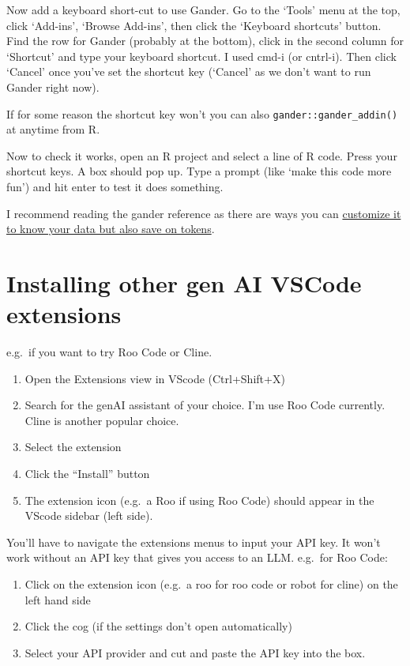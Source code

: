 \documentclass[
  letterpaper,
  DIV=11,
  numbers=noendperiod]{scrreprt}
\providecommand{\tightlist}{%
  \setlength{\itemsep}{0pt}\setlength{\parskip}{0pt}}\usepackage{longtable,booktabs,array}
\begin{document}
Now add a keyboard short-cut to use Gander. Go to the `Tools' menu at
the top, click `Add-ins', `Browse Add-ins', then click the `Keyboard
shortcuts' button. Find the row for Gander (probably at the bottom),
click in the second column for `Shortcut' and type your keyboard
shortcut. I used cmd-i (or cntrl-i). Then click `Cancel' once you've set
the shortcut key (`Cancel' as we don't want to run Gander right now).

If for some reason the shortcut key won't you can also
\texttt{gander::gander\_addin()} at anytime from R.

Now to check it works, open an R project and select a line of R code.
Press your shortcut keys. A box should pop up. Type a prompt (like `make
this code more fun') and hit enter to test it does something.

I recommend reading the gander reference as there are ways you can
\href{https://simonpcouch.github.io/gander/articles/gander.html}{customize
it to know your data but also save on tokens}.

\section{Installing other gen AI VSCode
extensions}\label{sec-otheroptions}

e.g.~if you want to try Roo Code or Cline.

\begin{enumerate}
\def\labelenumi{\arabic{enumi}.}
\tightlist
\item
  Open the Extensions view in VScode (Ctrl+Shift+X)
\item
  Search for the genAI assistant of your choice. I'm use Roo Code
  currently. Cline is another popular choice.
\item
  Select the extension
\item
  Click the ``Install'' button
\item
  The extension icon (e.g.~a Roo if using Roo Code) should appear in the
  VScode sidebar (left side).
\end{enumerate}

You'll have to navigate the extensions menus to input your API key. It
won't work without an API key that gives you access to an LLM. e.g.~for
Roo Code:

\begin{enumerate}
\def\labelenumi{\arabic{enumi}.}
\tightlist
\item
  Click on the extension icon (e.g.~a roo for roo code or robot for
  cline) on the left hand side
\item
  Click the cog (if the settings don't open automatically)
\item
  Select your API provider and cut and paste the API key into the box.
\end{enumerate}
\end{document}
